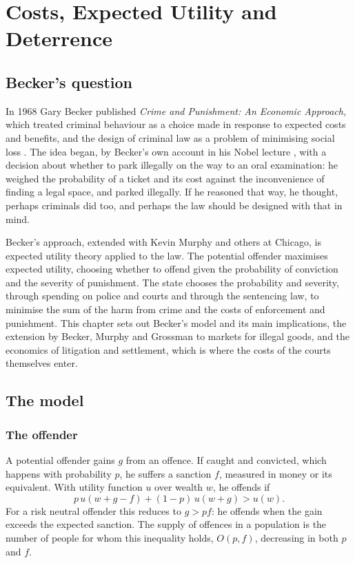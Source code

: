 \chapter{Costs, Expected Utility and Deterrence}
\label{ch:becker}

\section{Becker's question}

In 1968 Gary Becker published \emph{Crime and Punishment: An Economic Approach}, which treated criminal behaviour as a choice made in response to expected costs and benefits, and the design of criminal law as a problem of minimising social loss \citep{becker1968}. The idea began, by Becker's own account in his Nobel lecture \citep{becker1993}, with a decision about whether to park illegally on the way to an oral examination: he weighed the probability of a ticket and its cost against the inconvenience of finding a legal space, and parked illegally. If he reasoned that way, he thought, perhaps criminals did too, and perhaps the law should be designed with that in mind.

Becker's approach, extended with Kevin Murphy and others at Chicago, is expected utility theory applied to the law. The potential offender maximises expected utility, choosing whether to offend given the probability of conviction and the severity of punishment. The state chooses the probability and severity, through spending on police and courts and through the sentencing law, to minimise the sum of the harm from crime and the costs of enforcement and punishment. This chapter sets out Becker's model and its main implications, the extension by Becker, Murphy and Grossman to markets for illegal goods, and the economics of litigation and settlement, which is where the costs of the courts themselves enter.

\section{The model}

\subsection{The offender}

A potential offender gains $g$ from an offence. If caught and convicted, which happens with probability $p$, he suffers a sanction $f$, measured in money or its equivalent. With utility function $u$ over wealth $w$, he offends if
\begin{equation}
p\,u(w + g - f) + (1-p)\,u(w+g) > u(w).
\end{equation}
For a risk neutral offender this reduces to $g > pf$: he offends when the gain exceeds the expected sanction. The supply of offences in a population is the number of people for whom this inequality holds, $O(p, f)$, decreasing in both $p$ and $f$.


